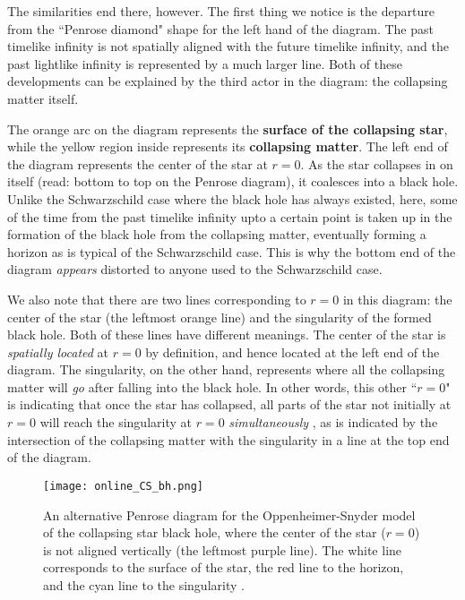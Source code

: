 \documentclass{article}
\begin{document}
The similarities end there, however. The first thing we notice is the departure from the ``Penrose diamond" shape for the left hand of the diagram. The past timelike infinity is not spatially aligned with the future timelike infinity, and the past lightlike infinity is represented by a much larger line. Both of these developments can be explained by the third actor in the diagram: the collapsing matter itself.

The orange arc on the diagram represents the \textbf{surface of the collapsing star}, while the yellow region inside represents its \textbf{collapsing matter}. The left end of the diagram represents the center of the star at  $r=0$. As the star collapses in on itself (read: bottom to top on the Penrose diagram), it coalesces into a black hole. Unlike the Schwarzschild case where the black hole has always existed, here, some of the time from the past timelike infinity upto a certain point is taken up in the formation of the black hole from the collapsing matter, eventually forming a horizon as is typical of the Schwarzschild case. This is why the bottom end of the diagram \textit{appears} distorted to anyone used to the Schwarzschild case.

We also note that there are two lines corresponding to $r=0$ in this diagram: the center of the star (the leftmost orange line) and the singularity of the formed black hole. Both of these lines have different meanings. The center of the star is \textit{spatially located} at $r=0$ by definition, and hence located at the left end of the diagram. The singularity, on the other hand, represents where all the collapsing matter will \textit{go} after falling into the black hole. In other words, this other ``$r=0$" is indicating that once the star has collapsed, all parts of the star not initially at $r=0$ will reach the singularity at $r=0$ \textit{simultaneously} \cite{townsend1997black}, as is indicated by the intersection of the collapsing matter with the singularity in a line at the top end of the diagram.

\begin{wrapfigure}{l}{0.5\textwidth}
\texttt{[image: online\_CS\_bh.png]} 
\caption{An alternative Penrose diagram for the Oppenheimer-Snyder model of the collapsing star black hole, where the center of the star ($r=0$) is not aligned vertically (the leftmost purple line). The white line corresponds to the surface of the star, the red line to the horizon, and the cyan line to the singularity \cite{collapse_colorado}.}
\label{fig:penrose_collapsing_star_colorado}

\end{wrapfigure}
\end{document}
